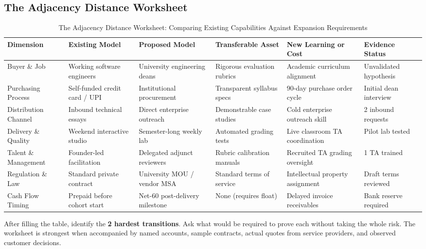 \subsection{The Adjacency Distance Worksheet}
\label{sec:adjacency_distance_worksheet}

\begin{table}[t]
\centering
\small
\caption{The Adjacency Distance Worksheet: Comparing Existing Capabilities Against Expansion Requirements}
\label{tab:adjacency_distance_worksheet}
\begin{tabularx}{\textwidth}{p{2.6cm} p{2.6cm} p{2.6cm} p{2.8cm} p{2.8cm} X}
\toprule
\textbf{Dimension} & \textbf{Existing Model} & \textbf{Proposed Model} & \textbf{Transferable Asset} & \textbf{New Learning or Cost} & \textbf{Evidence Status} \\
\midrule
Buyer \& Job & Working software engineers & University engineering deans & Rigorous evaluation rubrics & Academic curriculum alignment & Unvalidated hypothesis \\
\addlinespace[2pt]
Purchasing Process & Self-funded credit card / UPI & Institutional procurement & Transparent syllabus specs & 90-day purchase order cycle & Initial dean interview \\
\addlinespace[2pt]
Distribution Channel & Inbound technical essays & Direct enterprise outreach & Demonstrable case studies & Cold enterprise outreach skill & 2 inbound requests \\
\addlinespace[2pt]
Delivery \& Quality & Weekend interactive studio & Semester-long weekly lab & Automated grading tests & Live classroom TA coordination & Pilot lab tested \\
\addlinespace[2pt]
Talent \& Management & Founder-led facilitation & Delegated adjunct reviewers & Rubric calibration manuals & Recruited TA grading oversight & 1 TA trained \\
\addlinespace[2pt]
Regulation \& Law & Standard private contract & University MOU / vendor MSA & Standard terms of service & Intellectual property assignment & Draft terms reviewed \\
\addlinespace[2pt]
Cash Flow Timing & Prepaid before cohort start & Net-60 post-delivery milestone & None (requires float) & Delayed invoice receivables & Bank reserve required \\
\bottomrule
\end{tabularx}
\end{table}

After filling the table, identify the \textbf{2 hardest transitions}. Ask what would be required to prove each without taking the whole risk. The worksheet is strongest when accompanied by named accounts, sample contracts, actual quotes from service providers, and observed customer decisions.

